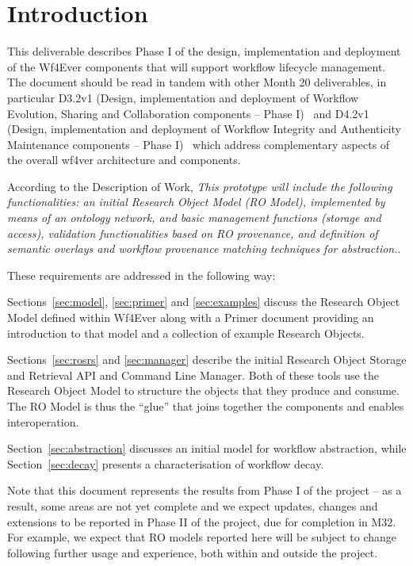 \section{Introduction}

This deliverable describes Phase I of the design, implementation and
deployment of the Wf4Ever components that will support workflow
lifecycle management. The document should be read in tandem with other
Month 20 deliverables, in particular D3.2v1 (Design, implementation
and deployment of Workflow Evolution, Sharing and Collaboration
components -- Phase I)~\cite{D3.2v1} and D4.2v1 (Design,
implementation and deployment of Workflow Integrity and Authenticity
Maintenance components -- Phase I)~\cite{D4.2v1} which address
complementary aspects of the overall wf4ver architecture and
components.

According to the Description of Work, \emph{This prototype will
  include the following functionalities: an initial Research Object
  Model (RO Model), implemented by means of an ontology network, and basic
  management functions (storage and access), validation
  functionalities based on RO provenance, and definition of semantic
  overlays and workflow provenance matching techniques for
  abstraction.}. 

These requirements are addressed in the following way:

Sections~\ref{sec:model}, \ref{sec:primer} and \ref{sec:examples}
discuss the Research Object Model defined within Wf4Ever along with a
Primer document providing an introduction to that model and a
collection of example Research Objects. 

Sections~\ref{sec:rosrs} and \ref{sec:manager} describe the initial
Research Object Storage and Retrieval API and Command Line
Manager. Both of these tools use the Research Object Model to
structure the objects that they produce and consume. The RO Model is
thus the ``glue'' that joins together the components and enables
interoperation. 

Section~\ref{sec:abstraction} discusses an initial model for workflow
abstraction, while Section~\ref{sec:decay} presents a characterisation
of workflow decay. 

Note that this document represents the results from Phase I of the
project -- as a result, some areas are not yet complete and we expect
updates, changes and extensions to be reported in Phase II of the
project, due for completion in M32. For example, we expect that RO models reported
here will be subject to change following further usage and experience,
both within and outside the project.